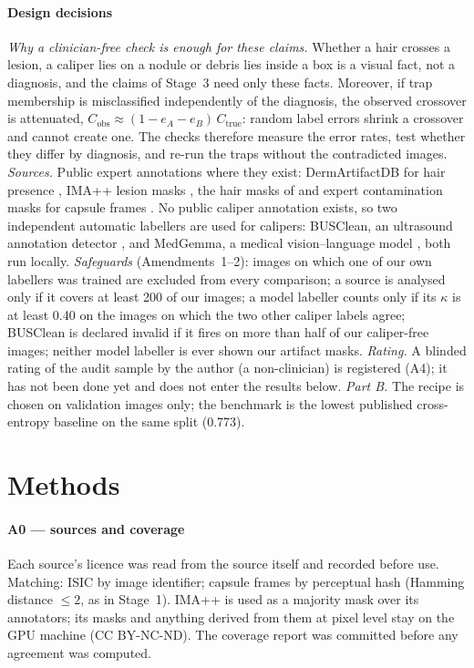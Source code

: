 \paragraph{Design decisions} \emph{Why a clinician-free check is enough for these claims.} Whether a hair crosses a lesion,
a caliper lies on a nodule or debris lies inside a box is a visual fact, not a diagnosis, and the claims of Stage~3 need
only these facts. Moreover, if trap membership is misclassified independently of the diagnosis, the observed crossover is
attenuated, $C_{\text{obs}}\approx(1-e_A-e_B)\,C_{\text{true}}$: random label errors shrink a crossover and cannot create
one. The checks therefore measure the error rates, test whether they differ by diagnosis, and re-run the traps without the
contradicted images. \emph{Sources.} Public expert annotations where they exist: DermArtifactDB for hair presence
\citep{dermartifactdb}, IMA++ lesion masks \citep{imapp}, the hair masks of \citet{kabirhair} and expert contamination masks
for capsule frames \citep{capsulemasks}. No public caliper annotation exists, so two independent automatic labellers are
used for calipers: BUSClean, an ultrasound annotation detector \citep{busclean}, and MedGemma, a medical vision--language
model \citep{medgemma}, both run locally. \emph{Safeguards} (Amendments~1--2): images on which one of our own labellers was
trained are excluded from every comparison; a source is analysed only if it covers at least 200 of our images; a model
labeller counts only if its $\kappa$ is at least 0.40 on the images on which the two other caliper labels agree; BUSClean
is declared invalid if it fires on more than half of our caliper-free images; neither model labeller is ever shown our
artifact masks. \emph{Rating.} A blinded rating of the audit sample by the author (a non-clinician) is registered (A4);
it has not been done yet and does not enter the results below. \emph{Part B.} The recipe is chosen on validation images
only; the benchmark is the lowest published cross-entropy baseline on the same split (0.773).

\section{Methods}
\paragraph{A0 --- sources and coverage} Each source's licence was read from the source itself and recorded before use.
Matching: ISIC by image identifier; capsule frames by perceptual hash (Hamming distance $\le2$, as in Stage~1). IMA++ is
used as a majority mask over its annotators; its masks and anything derived from them at pixel level stay on the GPU
machine (CC BY-NC-ND). The coverage report was committed before any agreement was computed.

